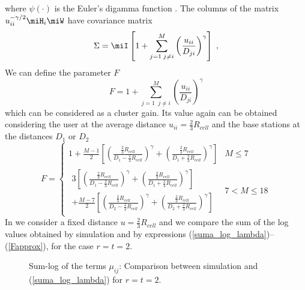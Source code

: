 where $\psi(\cdot)$ is the Euler's digamma function \cite{gradshteyn00}.  
The columns of the matrix $u_{ii}^{-\gamma/2}\miH_i\miW$ have covariance matrix
\begin{equation}
	\Sigma=\miI \left[1+\sum_{{j=1}\;{j\not=i}}^{M} \left(\frac{u_{ii}}{D_{ji}}\right)^{\gamma}\right]\;,
\end{equation}
We can define the parameter $F$
\begin{equation}
	F=1+\sum_{{j=1}\;\;{j\not=i}}^{M} \left(\frac{u_{ii}}{D_{ji}}\right)^{\gamma}
\end{equation}
which can be considered as a cluster gain. Its value again can be obtained considering the user at the average distance $u_{ii}=\frac{2}{3}R_{cell}$ and the base stations at the distances $D_1$ or $D_2$
\begin{equation}
	F=\begin{cases} 1+ \frac{M-1}{2}\left[ \left(\frac{\frac{2}{3}R_{cell}}{D_1-\frac{2}{3}R_{cell}}\right)^{\gamma} + \left(\frac{\frac{2}{3}R_{cell}}{D_1+\frac{2}{3}R_{cell}}\right)^{\gamma}\right]&M\leq7\\
                       \begin{array}{ll}3\left[\left(\frac{\frac{2}{3}R_{cell}}{D_1-\frac{2}{3}R_{cell}}\right)^{\gamma} 
                       + \left(\frac{\frac{2}{3}R_{cell}}{D_1+\frac{2}{3}R_{cell}}\right)^{\gamma}\right] \\
                       + \frac{M-7}{2} \left[\left(\frac{\frac{2}{3}R_{cell}}{D_2-\frac{2}{3}R_{cell}}\right)^{\gamma} + \left(\frac{\frac{2}{3}R_{cell}}{D_2+\frac{2}{3}R_{cell}}\right)^{\gamma}\right]\end{array} &7<M\leq18
          \end{cases}
  \label{Fapprox}
\end{equation}
In  we consider a fixed distance $u=\frac{2}{3}R_{cell}$ and we compare the sum of the log values obtained by simulation and by expressions (\ref{suma_log_lambda})--(\ref{Fapprox}), for the case $r=t=2$.
\begin{figure}[h]
\begin{center}
\begin{small}
\end{small}
\end{center}
\vspace*{-2.4mm}\caption{Sum-log of the terms $\mu_{ij}$: Comparison between simulation and (\ref{suma_log_lambda}) for $r=t=2$.}\label{lambdaFig}
\end{figure}
